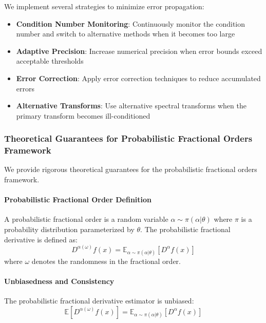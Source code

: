 We implement several strategies to minimize error propagation:

\begin{itemize}
\item \textbf{Condition Number Monitoring}: Continuously monitor the condition number and switch to alternative methods when it becomes too large
\item \textbf{Adaptive Precision}: Increase numerical precision when error bounds exceed acceptable thresholds
\item \textbf{Error Correction}: Apply error correction techniques to reduce accumulated errors
\item \textbf{Alternative Transforms}: Use alternative spectral transforms when the primary transform becomes ill-conditioned
\end{itemize}

\subsubsection{Theoretical Guarantees for Probabilistic Fractional Orders Framework}

We provide rigorous theoretical guarantees for the probabilistic fractional orders framework.

\paragraph{Probabilistic Fractional Order Definition}

\begin{definition}
A probabilistic fractional order is a random variable $\alpha \sim \pi(\alpha|\theta)$ where $\pi$ is a probability distribution parameterized by $\theta$. The probabilistic fractional derivative is defined as:
\begin{equation}
D^{\alpha(\omega)} f(x) = \mathbb{E}_{\alpha \sim \pi(\alpha|\theta)}[D^{\alpha} f(x)]
\end{equation}
where $\omega$ denotes the randomness in the fractional order.
\end{definition}

\paragraph{Unbiasedness and Consistency}

\begin{theorem}
The probabilistic fractional derivative estimator is unbiased:
\begin{equation}
\mathbb{E}[D^{\alpha(\omega)} f(x)] = \mathbb{E}_{\alpha \sim \pi(\alpha|\theta)}[D^{\alpha} f(x)]
\end{equation}
\end{theorem}

